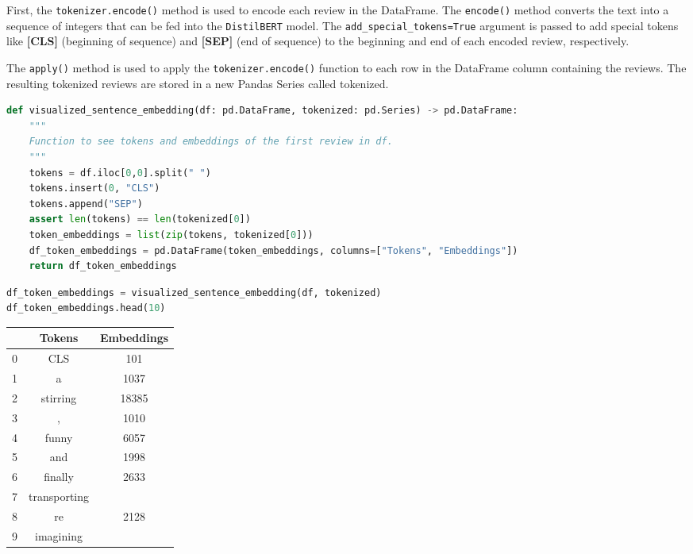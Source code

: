 First, the \lstinline{tokenizer.encode()} method is used
to encode each review in the DataFrame. The
\lstinline{encode()} method converts the text into a
sequence of integers that can be fed into the
\lstinline{DistilBERT} model. The
\lstinline{add_special_tokens=True} argument is passed
to add special tokens like \textbf{{[}CLS{]}} (beginning of sequence)
and \textbf{{[}SEP{]}} (end of sequence) to the beginning and end of
each encoded review, respectively. \newline

The \lstinline{apply()} method is used to apply the
\lstinline{tokenizer.encode()} function to each row in the
DataFrame column containing the reviews. The resulting tokenized reviews
are stored in a new Pandas Series called tokenized. \newline

\begin{lstlisting}[language=Python]
def visualized_sentence_embedding(df: pd.DataFrame, tokenized: pd.Series) -> pd.DataFrame:
    """
    Function to see tokens and embeddings of the first review in df.
    """
    tokens = df.iloc[0,0].split(" ")
    tokens.insert(0, "CLS")
    tokens.append("SEP")
    assert len(tokens) == len(tokenized[0])
    token_embeddings = list(zip(tokens, tokenized[0]))
    df_token_embeddings = pd.DataFrame(token_embeddings, columns=["Tokens", "Embeddings"])
    return df_token_embeddings
\end{lstlisting}

\begin{lstlisting}[language=Python]
df_token_embeddings = visualized_sentence_embedding(df, tokenized)
df_token_embeddings.head(10)
\end{lstlisting}

\begin{table}[!htbp]
    \centering
    \begin{tabular}{ccc}
         & Tokens & Embeddings\\
         \hline
        0 & CLS & 101\\
        1 & a & 1037\\
        2 & stirring & 18385\\
        3 & , & 1010\\
        4 & funny & 6057\\
        5 & and & 1998\\
        6 & finally & 2633\\
        7 & transporting & \textbf{}\\
        8 & re & 2128\\
        9 & imagining & \textbf{}\\
    \end{tabular}
\end{table}

